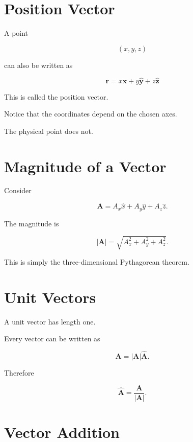 \documentclass[11pt,a4paper,openany]{book}
\begin{document}

\section{Position Vector}

A point

\[
(x,y,z)
\]

can also be written as

\[
\boxed{
	\mathbf r
	=
	x\hat{\mathbf x}
	+
	y\hat{\mathbf y}
	+
	z\hat{\mathbf z}
}
\]

This is called the position vector.

Notice that the coordinates depend on the chosen axes.

The physical point does not.


\section{Magnitude of a Vector}

Consider

\[
\mathbf A=
A_x\hat x
+
A_y\hat y
+
A_z\hat z.
\]

The magnitude is

\[
|\mathbf A|
=
\sqrt{
	A_x^2
	+
	A_y^2
	+
	A_z^2
}.
\]

This is simply the three-dimensional Pythagorean theorem.


\section{Unit Vectors}

A unit vector has length one.

Every vector can be written as

\[
\mathbf A
=
|\mathbf A|
\hat{\mathbf A}.
\]

Therefore

\[
\hat{\mathbf A}
=
\frac{\mathbf A}{|\mathbf A|}.
\]


\section{Vector Addition}
\end{document}
